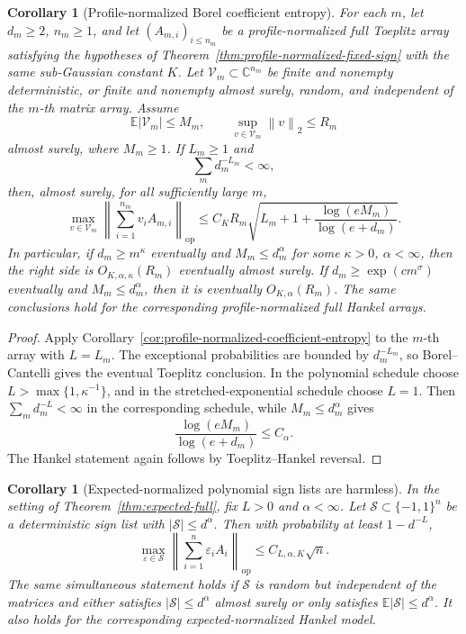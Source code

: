 \documentclass[11pt]{amsart}
\numberwithin{equation}{section}
\newtheorem{corollary}[theorem]{Corollary}
\theoremstyle{definition}
\theoremstyle{remark}
\newcommand{\op}{\mathrm{op}}
\newcommand{\Exp}{\mathbb E}
\newcommand{\norm}[1]{\left\lVert #1\right\rVert}
\newcommand{\abs}[1]{\left\lvert #1\right\rvert}
\newcommand{\eps}{\varepsilon}
\begin{document}
\begin{corollary}[Profile-normalized Borel coefficient entropy]
\label{cor:profile-normalized-coefficient-entropy-borel}
For each \(m\), let \(d_m\ge2\), \(n_m\ge1\), and let
\((A_{m,i})_{i\le n_m}\) be a profile-normalized full Toeplitz array satisfying
the hypotheses of Theorem~\ref{thm:profile-normalized-fixed-sign} with the same
sub-Gaussian constant \(K\).  Let
\(\mathcal V_m\subset\mathbb C^{n_m}\) be finite and nonempty deterministic, or
finite and nonempty almost surely, random, and independent of the \(m\)-th
matrix array.  Assume
\[
  \Exp\abs{\mathcal V_m}\le M_m,\qquad
  \sup_{v\in\mathcal V_m}\norm{v}_2\le R_m
\]
almost surely, where \(M_m\ge1\).  If \(L_m\ge1\) and
\[
  \sum_m d_m^{-L_m}<\infty ,
\]
then, almost surely, for all sufficiently large \(m\),
\[
  \max_{v\in\mathcal V_m}
  \norm{\sum_{i=1}^{n_m}v_iA_{m,i}}_{\op}
  \le
  C_K R_m\sqrt{L_m+1+
  \frac{\log(eM_m)}{\log(e+d_m)}} .
\]
In particular, if \(d_m\ge m^\kappa\) eventually and
\(M_m\le d_m^\alpha\) for some \(\kappa>0\), \(\alpha<\infty\), then the
right side is \(O_{K,\alpha,\kappa}(R_m)\) eventually almost surely.  If
\(d_m\ge \exp(c m^\sigma)\) eventually and \(M_m\le d_m^\alpha\), then it is
eventually \(O_{K,\alpha}(R_m)\).  The same conclusions hold for the
corresponding profile-normalized full Hankel arrays.
\end{corollary}

\begin{proof}
Apply Corollary~\ref{cor:profile-normalized-coefficient-entropy} to the
\(m\)-th array with \(L=L_m\).  The exceptional probabilities are bounded by
\(d_m^{-L_m}\), so Borel--Cantelli gives the eventual Toeplitz conclusion.  In
the polynomial schedule choose \(L>\max\{1,\kappa^{-1}\}\), and in the
stretched-exponential schedule choose \(L=1\).  Then
\(\sum_m d_m^{-L}<\infty\) in the corresponding schedule, while
\(M_m\le d_m^\alpha\) gives
\[
  \frac{\log(eM_m)}{\log(e+d_m)}\le C_\alpha .
\]
The Hankel statement again follows by Toeplitz--Hankel reversal.
\end{proof}

\begin{corollary}[Expected-normalized polynomial sign lists are harmless]
\label{cor:expected-sign-list}
In the setting of Theorem~\ref{thm:expected-full}, fix \(L>0\) and
\(\alpha<\infty\).  Let
\(\mathcal S\subset\{-1,1\}^n\) be a deterministic sign list with
\(\abs{\mathcal S}\le d^\alpha\).  Then with probability at least \(1-d^{-L}\),
\[
  \max_{\eps\in\mathcal S}
  \norm{\sum_{i=1}^n\eps_iA_i}_{\op}
  \le C_{L,\alpha,K}\sqrt n .
\]
The same simultaneous statement holds if \(\mathcal S\) is random but
independent of the matrices and either satisfies
\(\abs{\mathcal S}\le d^\alpha\) almost surely or only satisfies
\(\Exp\abs{\mathcal S}\le d^\alpha\).  It also holds for the corresponding
expected-normalized Hankel model.
\end{corollary}
\end{document}
